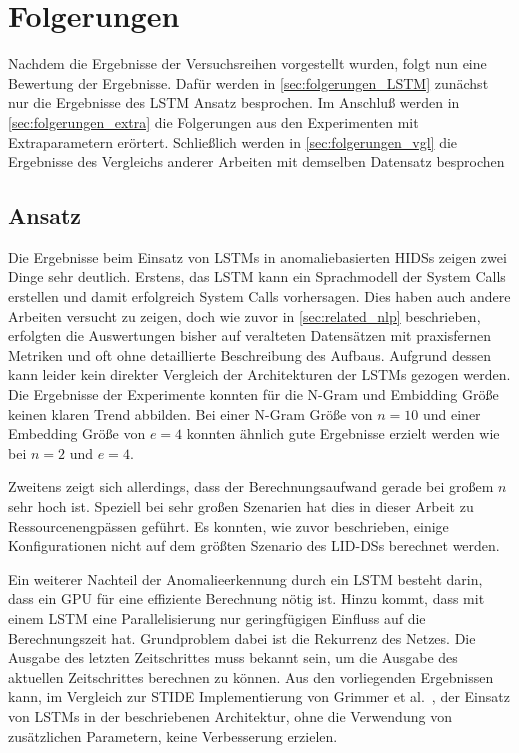 \chapter{Folgerungen}\label{ch:folgerungen}
Nachdem die Ergebnisse der Versuchsreihen vorgestellt wurden, folgt nun eine Bewertung der Ergebnisse.
Dafür werden in \autoref{sec:folgerungen_LSTM} zunächst nur die Ergebnisse des \ac{LSTM} Ansatz besprochen.
Im Anschluß werden in \autoref{sec:folgerungen_extra} die Folgerungen aus den Experimenten mit Extraparametern erörtert. 
Schließlich werden in \autoref{sec:folgerungen_vgl} die Ergebnisse des Vergleichs anderer Arbeiten mit demselben Datensatz besprochen

\section{ Ansatz}\label{sec:folgerungen_LSTM}

Die Ergebnisse beim Einsatz von \acp{LSTM} in anomaliebasierten \acp{HIDS} zeigen zwei Dinge sehr deutlich.
Erstens, das \ac{LSTM} kann ein Sprachmodell der System Calls erstellen und damit erfolgreich System Calls vorhersagen.
Dies haben auch andere Arbeiten versucht zu zeigen, doch wie zuvor in \autoref{sec:related_nlp} beschrieben, erfolgten die Auswertungen bisher auf veralteten Datensätzen mit praxisfernen Metriken und oft ohne detaillierte Beschreibung des Aufbaus.
Aufgrund dessen kann leider kein direkter Vergleich der Architekturen der \acp{LSTM} gezogen werden.
Die Ergebnisse der Experimente konnten für die N-Gram und Embidding Größe keinen klaren Trend abbilden.
Bei einer N-Gram Größe von $n=10$ und einer Embedding Größe von $e=4$ konnten ähnlich gute Ergebnisse erzielt werden wie bei $n=2$ und $e=4$.\par\medskip

Zweitens zeigt sich allerdings, dass der Berechnungsaufwand gerade bei großem $n$ sehr hoch ist.
Speziell bei sehr großen Szenarien hat dies in dieser Arbeit zu Ressourcenengpässen geführt.
Es konnten, wie zuvor beschrieben, einige Konfigurationen nicht auf dem größten Szenario des \acp{LID-DS} berechnet werden.\par\medskip
Ein weiterer Nachteil der Anomalieerkennung durch ein \ac{LSTM} besteht darin, dass ein GPU für eine effiziente Berechnung nötig ist.
Hinzu kommt, dass mit einem \ac{LSTM} eine Parallelisierung nur geringfügigen Einfluss auf die Berechnungszeit hat.
Grundproblem dabei ist die Rekurrenz des Netzes. 
Die Ausgabe des letzten Zeitschrittes muss bekannt sein, um die Ausgabe des aktuellen Zeitschrittes berechnen zu können.
Aus den vorliegenden Ergebnissen kann, im Vergleich zur \ac{STIDE} Implementierung von Grimmer et al.~\cite{IDSTHREADGRIMMER2021}, der Einsatz von \acp{LSTM} in der beschriebenen Architektur, ohne die Verwendung von zusätzlichen Parametern, keine Verbesserung erzielen.\par\medskip

